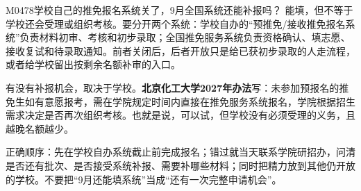 \begin{qa}{M0478}{学校自己的推免报名系统关了，9月全国系统还能补报吗？}
能填，但不等于学校还会受理或组织考核。要分开两个系统：学校自办的“预推免/接收推免报名系统”负责材料初审、考核和初步录取；全国推免服务系统负责资格确认、填志愿、接收复试和待录取通知。前者关闭后，后者开放只是给已获初步录取的人走流程，或者给学校留出按剩余名额补审的入口。

有没有补报机会，取决于学校。\textbf{北京化工大学2027年办法}写：未参加预报名的推免生如有意愿报考，需在学院规定时间内直接在推免服务系统报名，学院根据招生需求决定是否再次组织考核。也就是说，可以试，但学校没有必须受理的义务，且越晚名额越少。

正确顺序：先在学校自办系统截止前完成报名；错过就当天联系学院研招办，问清是否还有批次、是否接受系统补报、需要补哪些材料；同时把精力放到其他仍开放的学校。不要把“9月还能填系统”当成“还有一次完整申请机会”。
\end{qa}

